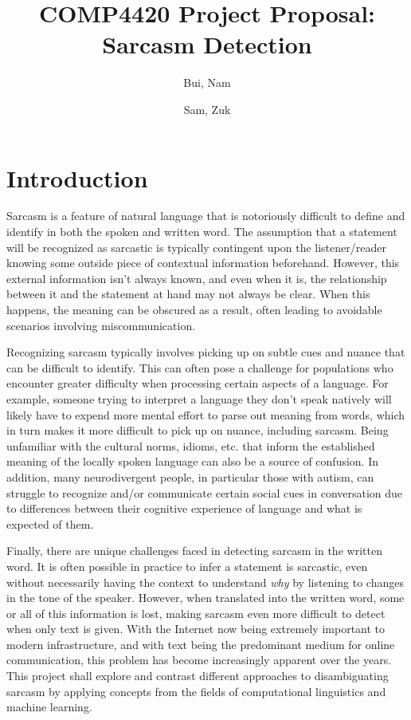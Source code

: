 \documentclass[11pt]{article}
\title{COMP4420 Project Proposal: Sarcasm Detection}
\author{
    Bui, Nam \\
    \email{nam\_bui@student.uml.edu}
    \and
    Sam, Zuk \\
    \email {samuel\_zuk@student.uml.edu}
}
\begin{document}
\maketitle

\section{Introduction}

Sarcasm is a feature of natural language that is notoriously difficult to
define and identify in both the spoken and written word. The assumption that a
statement will be recognized as sarcastic is typically contingent upon the
listener/reader knowing some outside piece of contextual information
beforehand. However, this external information isn't always known, and even
when it is, the relationship between it and the statement at hand may not
always be clear. When this happens, the meaning can be obscured as a result,
often leading to avoidable scenarios involving miscommunication.

Recognizing sarcasm typically involves picking up on subtle cues and
nuance that can be difficult to identify. This can often pose a challenge for
populations who encounter greater difficulty when processing certain aspects of
a language. For example, someone trying to interpret a language they don't
speak natively will likely have to expend more mental effort to parse out
meaning from words, which in turn makes it more difficult to pick up on nuance,
including sarcasm. Being unfamiliar with the cultural norms, idioms, etc. that
inform the established meaning of the locally spoken language can also be a
source of confusion. In addition, many neurodivergent people, in particular
those with autism, can struggle to recognize and/or communicate certain social
cues in conversation due to differences between their cognitive experience of
language and what is expected of them.

Finally, there are unique challenges faced in detecting sarcasm in the
written word. It is often possible in practice to infer a statement is
sarcastic, even without necessarily having the context to understand
\textit{why} by listening to changes in the tone of the speaker. However, when
translated into the written word, some or all of this information is lost,
making sarcasm even more difficult to detect when only text is given. With the
Internet now being extremely important to modern infrastructure, and with text
being the predominant medium for online communication, this problem has become
increasingly apparent over the years. This project shall explore and contrast
different approaches to disambiguating sarcasm by applying concepts from the
fields of computational linguistics and machine learning.
\end{document}
